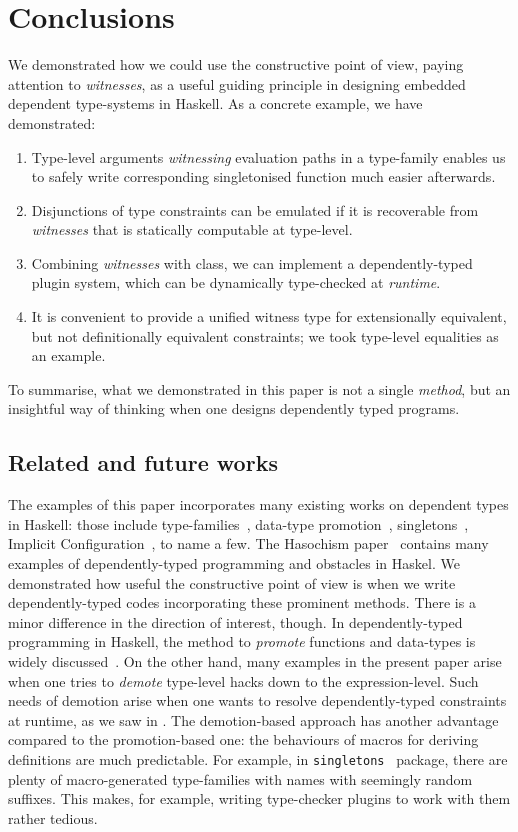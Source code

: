 \documentclass[demotion-paper.tex]{subfiles}
\begin{document}
\section{Conclusions}
\label{sec:concl}
We demonstrated how we could use the constructive point of view, paying attention to \emph{witnesses}, as a useful guiding principle in designing embedded dependent type-systems in Haskell.
As a concrete example, we have demonstrated:
\begin{enumerate}
  \item Type-level arguments \emph{witnessing} evaluation paths in a type-family enables us to safely write corresponding singletonised function much easier afterwards.
  \item Disjunctions of type constraints can be emulated if it is recoverable from \emph{witnesses} that is statically computable at type-level.
  \item Combining \emph{witnesses} with  class, we can implement a dependently-typed plugin system, which can be dynamically type-checked at \emph{runtime}.
  \item It is convenient to provide a unified witness type for extensionally equivalent, but not definitionally equivalent constraints; we took type-level equalities as an example.
\end{enumerate}
To summarise, what we demonstrated in this paper is not a single \emph{method}, but an insightful way of thinking when one designs dependently typed programs.

\subsection{Related and future works}
The examples of this paper incorporates many existing works on dependent types in Haskell: those include type-families~\cite{Kiselyov:2010aa}, data-type promotion~\cite{Yorgey:2012}, singletons~\cite{Eisenberg:2012}, Implicit Configuration~\cite{Kiselyov:2004aa}, to name a few.
The Hasochism paper~\cite{10.1145/2503778.2503786} contains many examples of dependently-typed programming and obstacles in Haskel.
We demonstrated how useful the constructive point of view is when we write dependently-typed codes incorporating these prominent methods.
There is a minor difference in the direction of interest, though.
In dependently-typed programming in Haskell, the method to \emph{promote} functions and data-types is widely discussed~\cite{Yorgey:2012,Eisenberg:2012,10.1145/2503778.2503786}.
On the other hand, many examples in the present paper arise when one tries to \emph{demote} type-level hacks down to the expression-level.
Such needs of demotion arise when one wants to resolve dependently-typed constraints at runtime, as we saw in .
The demotion-based approach has another advantage compared to the promotion-based one: the behaviours of macros for deriving definitions are much predictable.
For example, in \texttt{singletons}~\cite{singletons} package, there are plenty of macro-generated type-families with names with seemingly random suffixes.
This makes, for example, writing type-checker plugins to work with them rather tedious.
\end{document}
